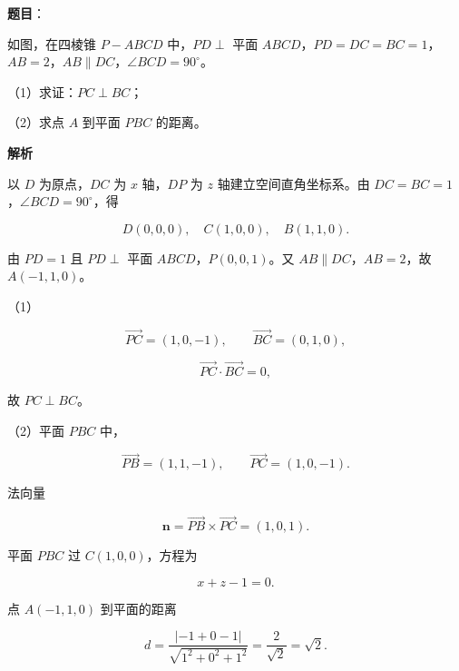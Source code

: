 \begin{answer}

\textbf{题目}：

如图，在四棱锥 $P-ABCD$ 中，$PD\perp$ 平面 $ABCD$，$PD=DC=BC=1$，$AB=2$，$AB\parallel DC$，$\angle BCD=90^\circ$。

（1）求证：$PC\perp BC$；

（2）求点 $A$ 到平面 $PBC$ 的距离。
\nopagebreak[4]
\begin{center}\end{center}
\nopagebreak[4]
\textbf{解析}

以 $D$ 为原点，$DC$ 为 $x$ 轴，$DP$ 为 $z$ 轴建立空间直角坐标系。由 $DC=BC=1$，$\angle BCD=90^\circ$，得

\nopagebreak[4]
\[D(0,0,0),\quad C(1,0,0),\quad B(1,1,0).\]

由 $PD=1$ 且 $PD\perp$ 平面 $ABCD$，$P(0,0,1)$。又 $AB\parallel DC$，$AB=2$，故 $A(-1,1,0)$。

（1）

\nopagebreak[4]
\[\overrightarrow{PC}=(1,0,-1),\qquad \overrightarrow{BC}=(0,1,0),\]

\nopagebreak[4]
\[\overrightarrow{PC}\cdot\overrightarrow{BC}=0,\]

故 $PC\perp BC$。

（2）平面 $PBC$ 中，

\nopagebreak[4]
\[\overrightarrow{PB}=(1,1,-1),\qquad \overrightarrow{PC}=(1,0,-1).\]

法向量

\nopagebreak[4]
\[\boldsymbol n=\overrightarrow{PB}\times\overrightarrow{PC}
=(1,0,1).\]

平面 $PBC$ 过 $C(1,0,0)$，方程为

\nopagebreak[4]
\[x+z-1=0.\]

点 $A(-1,1,0)$ 到平面的距离

\nopagebreak[4]
\[d=\frac{|{-1}+0-1|}{\sqrt{1^2+0^2+1^2}}
=\frac2{\sqrt2}=\sqrt2.\]


\end{answer}
